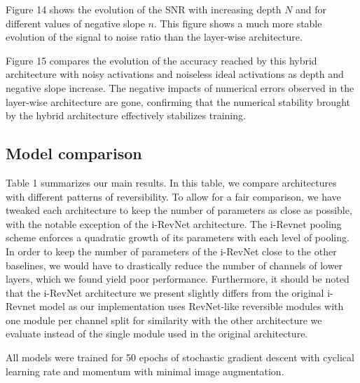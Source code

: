 \documentclass[twocolumn]{bmcart}
\begin{document}
Figure 14 shows the evolution of the SNR with increasing depth $N$ and for different values of negative slope $n$.
This figure shows a much more stable evolution of the signal to noise ratio than the layer-wise architecture.

Figure 15 compares the evolution of the accuracy reached by this hybrid architecture with noisy activations and noiseless ideal activations as depth and negative slope increase.
The negative impacts of numerical errors observed in the layer-wise architecture are gone,
confirming that the numerical stability brought by the hybrid architecture effectively stabilizes training.


\subsection{Model comparison}

Table 1 summarizes our main results.
In this table, we compare architectures with different patterns of reversibility.
To allow for a fair comparison, we have tweaked each architecture to keep the number of parameters as close as possible,
with the notable exception of the i-RevNet architecture.
The i-Revnet pooling scheme enforces a quadratic growth of its parameters with each level of pooling.
In order to keep the number of parameters of the i-RevNet close to the other baselines, we would have to drastically
reduce the number of channels of lower layers, which we found yield poor performance.
Furthermore, it should be noted that the i-RevNet architecture we present slightly differs from the original i-Revnet model
as our implementation uses RevNet-like reversible modules with one module per channel split for similarity with
the other architecture we evaluate instead of the single module used in the original architecture.

All models were trained for 50 epochs of stochastic gradient descent with cyclical learning rate and momentum \cite{smith2017super} with minimal image augmentation.
\end{document}
